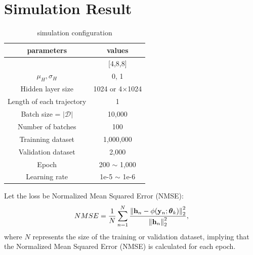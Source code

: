 \documentclass[journal,10pt,twocolumn]{IEEEtran}
\begin{document}
    \section{Simulation Result}


        \begin{table}[h] \label{tab:Configuration}
        \centering
        \renewcommand{\arraystretch}{1.5}
        \begin{tabular}{|c|c|}
            \hline
            parameters   &values \\
            \hline \hline
            [$n_R,n_T$,$T$]                 &[4,8,8]        \\ \hline
            $\mu_H, \sigma_H$               &0, 1          \\ \hline
            Hidden layer size               &1024 or 4$\times$1024   \\ \hline
            Length of each trajectory       &1                      \\ \hline
            Batch size = $|\mathcal{D}|$    &10,000         \\ \hline
            Number of batches               &100            \\ \hline
            Trainning dataset               &1,000,000      \\ \hline
            Validation dataset              &2,000          \\ \hline
            Epoch                           &200 $\sim$ 1,000   \\ \hline
            Learning rate                   &1e-5 $\sim$ 1e-6  \\ \hline
        \end{tabular}
        \caption{simulation configuration}
        \end{table}
        Let the loss be Normalized Mean Squared Error (NMSE):
        \begin{equation} \label{NMSE}
            NMSE=\frac{1}{N} \sum\limits_{n=1}^N
            \frac{\left\| {\bf h}_n-\phi(\mathbf{y}_n;\boldsymbol{\theta}_k) \right\|^2_2}
            {\left\| {\bf h}_n \right\|^2_2},
        \end{equation}
        where $N$ represents the size of the training or validation dataset, 
        implying that the Normalized Mean Squared Error (NMSE) is calculated for each epoch.\\
\end{document}
